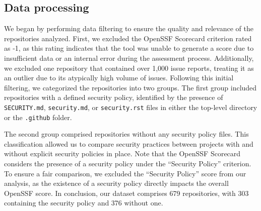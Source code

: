 
\subsection{Data processing}
We began by performing data filtering to ensure the quality and relevance of the repositories analyzed. First, we excluded the OpenSSF Scorecard criterion rated as -1, as this rating indicates that the tool was unable to generate a score due to insufficient data or an internal error during the assessment process. Additionally, we excluded one repository that contained over 1,000 issue reports, treating it as an outlier due to its atypically high volume of issues. Following this initial filtering, we categorized the repositories into two groups. The first group included repositories with a defined security policy, identified by the presence of \texttt{SECURITY.md}, \texttt{security.md}, or \texttt{security.rst} files in either the top-level directory or the \texttt{.github} folder. 

The second group comprised repositories without any security policy files. This classification allowed us to compare security practices between projects with and without explicit security policies in place. Note that the OpenSSF Scorecard considers the presence of a security policy under the ``Security Policy'' criterion. To ensure a fair comparison, we excluded the ``Security Policy'' score from our analysis, as the existence of a security policy directly impacts the overall OpenSSF score. In conclusion, our dataset comprises 679 repositories, with 303 containing the security policy and 376 without one.






